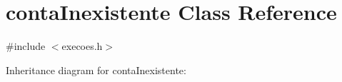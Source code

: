 \hypertarget{classcontaInexistente}{}\section{conta\+Inexistente Class Reference}
\label{classcontaInexistente}


{\ttfamily \#include $<$execoes.\+h$>$}



Inheritance diagram for conta\+Inexistente\+:
